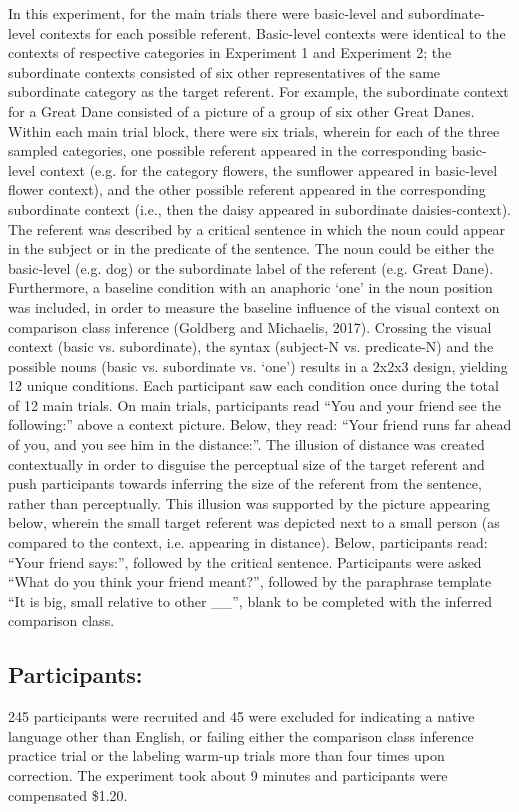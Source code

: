 In this experiment, for the main trials there were basic-level and subordinate-level contexts for each possible referent. Basic-level contexts were identical to the contexts of respective categories in Experiment 1 and Experiment 2; the subordinate contexts consisted of six other representatives of the same subordinate category as the target referent. For example, the subordinate context for a Great Dane consisted of a picture of a group of six other Great Danes. Within each main trial block, there were six trials, wherein for each of the three sampled categories, one possible referent appeared in the corresponding basic-level context (e.g. for the category flowers, the sunflower appeared in basic-level flower context), and the other possible referent appeared in the corresponding subordinate context (i.e., then the daisy appeared in subordinate daisies-context). 
The referent was described by a critical sentence in which the noun could appear in the subject or in the predicate of the sentence. The noun could be either the basic-level (e.g. dog) or the subordinate label of the referent (e.g. Great Dane). Furthermore, a baseline condition with an anaphoric ‘one’ in the noun position was included, in order to measure the baseline influence of the visual context on comparison class inference (Goldberg and Michaelis, 2017). Crossing the visual context (basic vs. subordinate), the syntax (subject-N vs. predicate-N) and the possible nouns (basic vs. subordinate vs. ‘one’) results in a 2x2x3 design, yielding 12 unique conditions. Each participant saw each condition once during the total of 12 main trials.   
On main trials, participants read “You and your friend see the following:” above a context picture. Below, they read: “Your friend runs far ahead of you, and you see him in the distance:”. The illusion of distance was created contextually in order to disguise the perceptual size of the target referent and push participants towards inferring the size of the referent from the sentence, rather than perceptually. This illusion was supported by the picture appearing below, wherein the small target referent was depicted next to a small person (as compared to the context, i.e. appearing in distance). Below, participants read: “Your friend says:”, followed by the critical sentence. Participants were asked “What do you think your friend meant?”, followed by the paraphrase template “It is {big, small} relative to other \_\_”, blank to be completed with the inferred comparison class. 

\subsection{Participants:}
245 participants were recruited and 45 were excluded for indicating a native language other than English, or failing either the comparison class inference practice trial or the labeling warm-up trials more than four times upon correction. The experiment took about 9 minutes and participants were compensated \$1.20. 
